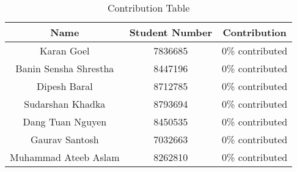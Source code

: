 \begin{contribution}
    \vspace{3cm}
    \begin{table}[h]
        \centering
        \Large
        \caption{Contribution Table}
        \vspace{0.4cm}
        \begin{tabular}{|c|c|c|}
        \hline
        \textbf{Name} & \textbf{ Student Number } & \textbf{ Contribution } \\
        \hline
        Karan Goel & 7836685 & 0\% contributed \\
        Banin Sensha Shrestha & 8447196 & 0\% contributed \\ 
        Dipesh Baral & 8712785 & 0\% contributed \\ 
        Sudarshan Khadka & 8793694 & 0\% contributed \\
        Dang Tuan Nguyen & 8450535 & 0\% contributed \\
        Gaurav Santosh & 7032663 & 0\% contributed  \\
        Muhammad Ateeb Aslam & 8262810 & 0\% contributed \\
        \hline
        \end{tabular}
        \label{tab:contribution}
    \end{table}
    
\end{contribution}